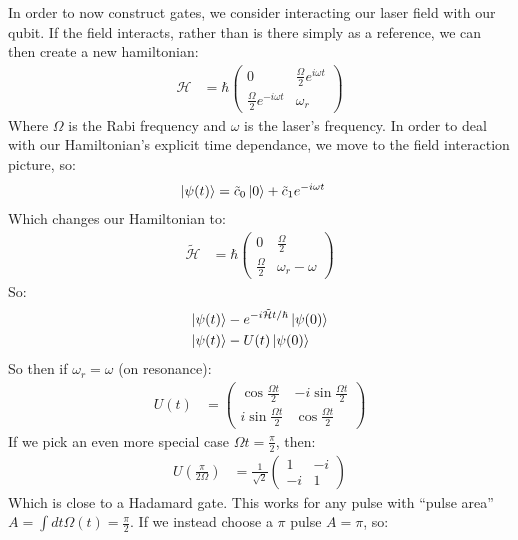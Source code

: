 In order to now construct gates, we consider interacting our laser field with our qubit. If the field interacts, rather than is there simply as a reference, we can then create a new hamiltonian:
\begin{align*}
	\mathcal{H} &= \hbar\begin{pmatrix}
		0 & \frac{\Omega}{2} e^{i\omega t} \\
		\frac{\Omega}{2} e^{-i\omega t} & \omega_r
		       \end{pmatrix}
\end{align*}
Where $\Omega$ is the Rabi frequency and $\omega$ is the laser's frequency. In order to deal with our Hamiltonian's explicit time dependance, we move to the field interaction picture, so:
\begin{align*}
	\ket{\psi(t)} &= \tilde{c}_0 \ket{0} + \tilde{c}_1 e^{-i\omega t}
\end{align*}
Which changes our Hamiltonian to:
\begin{align*}
	\tilde{\mathcal{H}} &= \hbar\begin{pmatrix}
		0 & \frac{\Omega}{2} \\
		\frac{\Omega}{2} & \omega_r-\omega
		       \end{pmatrix}
\end{align*}
So:
\begin{align*}
	\ket{\psi(t)} &- e^{-i\tilde{\mathcal{H}} t/\hbar}\ket{\psi(0)} \\
	\ket{\psi(t)} &- U(t)\ket{\psi(0)} \\
\end{align*}
So then if $\omega_r = \omega$ (on resonance):
\begin{align*}
	U(t) &= \begin{pmatrix}
		\cos\frac{\Omega t}{2} & -i\sin\frac{\Omega t}{2} \\
		i\sin\frac{\Omega t}{2} & \cos\frac{\Omega t}{2}
		\end{pmatrix}
\end{align*}
If we pick an even more special case $\Omega t = \frac{\pi}{2}$, then:
\begin{align*}
	U\left(\frac{\pi}{2\Omega}\right)  &= \frac{1}{\sqrt{2}}\begin{pmatrix}
		1 & -i \\
		-i & 1
					      \end{pmatrix}
\end{align*}
Which is close to a Hadamard gate. This works for any pulse with ``pulse area'' $A = \int dt \Omega(t) = \frac{\pi}{2}$.
If we instead choose a $\pi$ pulse $A = \pi$, so:
